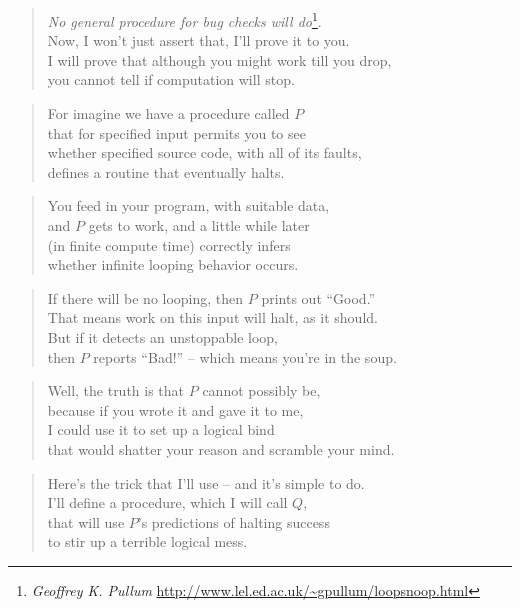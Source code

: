 \documentclass{article}
\begin{document}
\begin{verse}
\emph{No general procedure for bug checks will do}\footnote{%
\emph{Geoffrey K. Pullum}
\url{http://www.lel.ed.ac.uk/~gpullum/loopsnoop.html}%
}.\\
Now, I won't just assert that, I’ll prove it to you.\\
I will prove that although you might work till you drop,\\
you cannot tell if computation will stop.
\end{verse}
\begin{verse}
For imagine we have a procedure called \(P\)\\
that for specified input permits you to see\\
whether specified source code, with all of its faults,\\
defines a routine that eventually halts.
\end{verse}
\begin{verse}
You feed in your program, with suitable data,\\
and \(P\) gets to work, and a little while later\\
(in finite compute time) correctly infers\\
whether infinite looping behavior occurs.
\end{verse}
\begin{verse}
If there will be no looping, then \(P\) prints out ``Good.''\\
That means work on this input will halt, as it should.\\
But if it detects an unstoppable loop,\\
then \(P\) reports ``Bad!'' -- which means you're in the soup.
\end{verse}
\begin{verse}
Well, the truth is that \(P\) cannot possibly be,\\
because if you wrote it and gave it to me,\\
I could use it to set up a logical bind\\
that would shatter your reason and scramble your mind.
\end{verse}
\begin{verse}
Here's the trick that I’ll use -- and it's simple to do.\\
I’ll define a procedure, which I will call \(Q\),\\
that will use \(P\)'s predictions of halting success\\
to stir up a terrible logical mess.
\end{verse}
\end{document}
